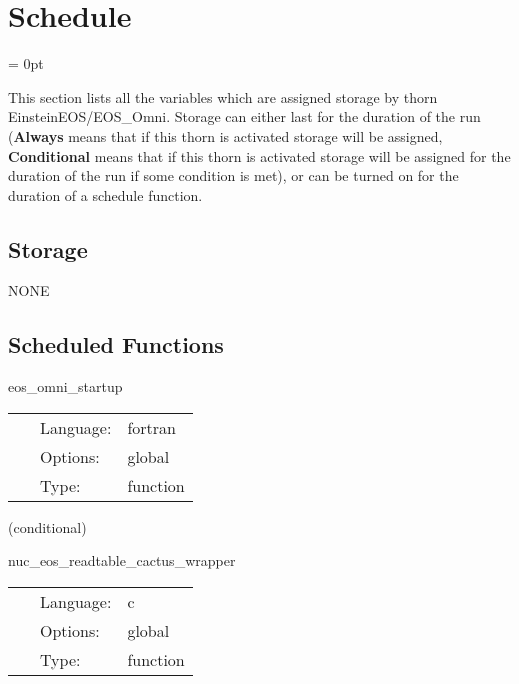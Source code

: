 
\section{Schedule} 


\parskip = 0pt


\noindent This section lists all the variables which are assigned storage by thorn EinsteinEOS/EOS\_Omni.  Storage can either last for the duration of the run ({\bf Always} means that if this thorn is activated storage will be assigned, {\bf Conditional} means that if this thorn is activated storage will be assigned for the duration of the run if some condition is met), or can be turned on for the duration of a schedule function.


\subsection*{Storage}NONE
\subsection*{Scheduled Functions}
\vspace{5mm}


\hspace{5mm} eos\_omni\_startup 

\hspace{5mm}{\it set up conversion factors and other fun stuff } 


\hspace{5mm}

 \begin{tabular*}{160mm}{cll} 
~ & Language:  & fortran \\ 
~ & Options:  & global \\ 
~ & Type:  & function \\ 
\end{tabular*} 


\vspace{5mm}

   (conditional) 

\hspace{5mm} nuc\_eos\_readtable\_cactus\_wrapper 

\hspace{5mm}{\it read eos hdf5 table } 


\hspace{5mm}

 \begin{tabular*}{160mm}{cll} 
~ & Language:  & c \\ 
~ & Options:  & global \\ 
~ & Type:  & function \\ 
\end{tabular*} 


